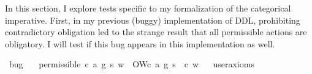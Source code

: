 \begin{isabellebody}
%
\isatagdocument
%
\isamarkuptrue%
%
\endisatagdocument
{\isafolddocument}%
%
\isadelimdocument
%
\endisadelimdocument
%
\begin{isamarkuptext}%
In this section, I explore tests specific to my formalization of the categorical imperative. First, 
in my previous (buggy) implementation of DDL, prohibiting contradictory obligation led to the strange 
result that all permissible actions are obligatory. I will test if this bug appears in this implementation 
as well.%
\end{isamarkuptext}\isamarkuptrue%
\isamarkupfalse%
\ bug{\isacharcolon}\isanewline
\ \ \ {\isachardoublequoteopen}permissible\ {\isacharparenleft}c{\isacharcomma}\ a{\isacharcomma}\ g{\isacharparenright}\ s\ w\ {\isasymlongrightarrow}\ O{\isacharbraceleft}W{\isacharparenleft}c{\isacharcomma}\ a{\isacharcomma}\ g{\isacharparenright}\ s\ {\isacharbar}\ c{\isacharbraceright}\ w{\isachardoublequoteclose}\isanewline
\ \ \isamarkupfalse%
{\isacharbrackleft}user{\isacharunderscore}axioms{\isacharbrackright}%
\isadelimproof
\ %
\endisadelimproof
%
\isatagproof
{}\isamarkupfalse%
\isanewline
%
\isanewline
%
\endisatagproof
{\isafoldproof}%
%
\isadelimproof
%
\endisadelimproof
%
\isadelimtheory
%
\endisadelimtheory
%
\isatagtheory
%
\endisatagtheory
{\isafoldtheory}%
%
\isadelimtheory
%
\endisadelimtheory
%
\end{isabellebody}%
\endinput
